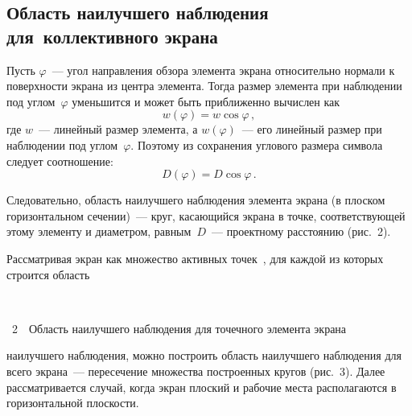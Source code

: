 \begin{multicols}{2}
\subsection{Область наилучшего наблюдения для~коллективного экрана} 
    
    Пусть $\varphi$~--- угол направления обзора элемента экрана 
относительно нормали к поверхности экрана из центра элемента. Тогда 
размер элемента при наблюдении под углом~$\varphi$ уменьшится и может 
быть приближенно вычислен как
    \begin{equation}
    w(\varphi)=w\cos\varphi\,,
    \label{e2chu}
    \end{equation}
    где $w$~--- линейный размер элемента, а $w(\varphi)$~--- его линейный 
размер при наблюдении под углом~$\varphi$. Поэтому из сохранения 
углового размера символа следует соотношение:
    \begin{equation*}
    D(\varphi)=D\cos\varphi\,.
    \end{equation*}

Следовательно, область наилучшего наблюдения элемента экрана (в плоском 
горизонтальном сечении)~--- круг, касающийся экрана в точке, 
соответствующей этому элементу и диаметром, равным~$D$~--- проектному 
расстоянию (рис.~2).




    Рассматривая экран как множество активных точек~\cite{16chu}, для 
каждой из которых строится область\linebreak\vspace*{-12pt}

\begin{center} %
\mbox{%
\epsfxsize=43.302mm
}
\end{center}
\vspace*{4pt}
\begin{center}
{{\figurename~2}\ \ \small{Область наилучшего наблюдения для точечного элемента экрана}}
\end{center}

\medskip
\addtocounter{figure}{1}

\noindent
 наилучшего наблюдения, можно 
построить область наилучшего наблюдения для всего экрана~--- пересечение 
множества построенных кругов (рис.~3). Далее рассматривается случай, 
когда экран плоский и рабочие места располагаются в горизонтальной 
плоскости.




\end{multicols}
